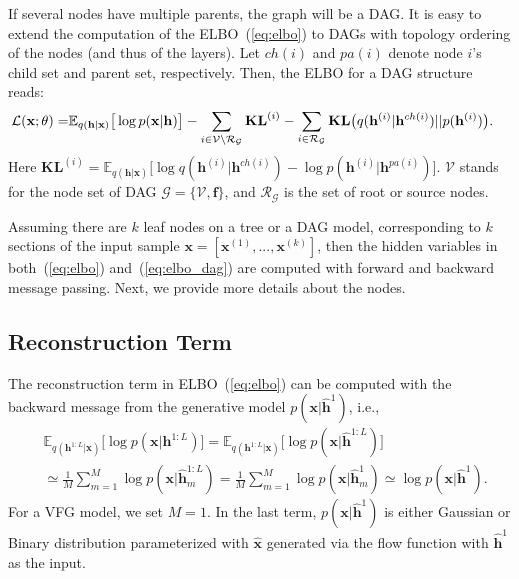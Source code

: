 \documentclass{article}
\begin{document}
If several nodes have multiple parents, the graph will be a DAG. It is easy to extend the computation of the ELBO~(\ref{eq:elbo}) to DAGs with topology ordering of the nodes (and thus of the layers). 
Let $ch(i)$ and $pa(i)$ denote node $i$'s child set and parent set, respectively.
Then, the ELBO for a DAG structure reads:
\begin{align}\label{eq:elbo_dag_2}
\mathcal{L}(\mathbf{x}; \theta) =& \mathbb{E}_{q(\mathbf{h}|\mathbf{x})}\big[ \log p(\mathbf{x}|\mathbf{h})  \big] -  \sum_{i \in \mathcal{V}  \setminus  \mathcal{R}_{ \mathcal{G} }} \textbf{\text{KL}}^{(i)}   -    \sum_{i \in  \mathcal{R}_{ \mathcal{G} }  }  \textbf{\text{KL}}\big(q(\mathbf{h}^{(i)} | \mathbf{h}^{ch(i)} )   || p(\mathbf{h}^{(i)})  \big) .
\end{align}
Here $\mathbf{KL}^{(i)}=\mathbb{E}_{q(\mathbf{h}|\mathbf{x})}\big[  \log q(\mathbf{h}^{(i)}|\mathbf{h}^{ch(i)})   - \log p(\mathbf{h}^{(i)}|\mathbf{h}^{pa(i)}) \big]$. $\mathcal{V}$ stands for the node set of DAG $\mathcal{G} = \{\mathcal{V}, \mathbf{f}\}$, and $\mathcal{R}_{ \mathcal{G}}$ is the set of root or source nodes. 
 
Assuming there are $k$ leaf nodes on a tree or a DAG model, corresponding to $k$ sections of the input sample $\mathbf{x} = [\mathbf{x}^{(1)}, ..., \mathbf{x}^{(k)}]$, then the hidden variables in both~(\ref{eq:elbo}) and~(\ref{eq:elbo_dag}) are computed with forward and backward message passing. 
Next, we provide more details about the nodes.

\subsection{Reconstruction Term}

The reconstruction term in ELBO~(\ref{eq:elbo}) can be computed with the backward message from the generative model $p(\mathbf{x}| \widehat{\mathbf{h}}^{1})$, i.e.,
\begin{align*} 
&\mathbb{E}_{q(\mathbf{h}^{1:L}|\mathbf{x})}\big[ \log p(\mathbf{x}|\mathbf{h}^{1:L})\big]
=\mathbb{E}_{q(\mathbf{h}^{1:L}|\mathbf{x})}\big[ \log p(\mathbf{x}|\widehat{\mathbf{h}}^{1:L})  \big] \\
&\simeq \frac{1}{M}\sum_{m=1}^M \log p(\mathbf{x}| \widehat{\mathbf{h}}^{1:L}_m) = \frac{1}{M}\sum_{m=1}^M \log p(\mathbf{x}| \widehat{\mathbf{h}}^{1}_m) \simeq  \log p(\mathbf{x}| \widehat{\mathbf{h}}^{1}) .
 \end{align*}
For a VFG model, we set $M=1$. In the last term,  $p(\mathbf{x}| \widehat{\mathbf{h}}^{1})$ is either Gaussian or Binary distribution parameterized with $\widehat{\mathbf{x}}$ generated via the flow function with $\widehat{\mathbf{h}}^{1}$ as the input. 
\end{document}
